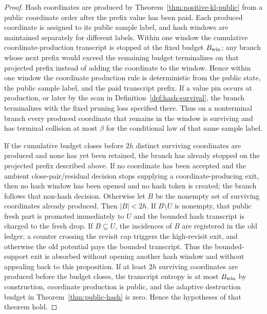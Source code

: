 \documentclass[11pt]{article}
\begin{document}
\begin{proof}
Hash coordinates are produced by Theorem~\ref{thm:positive-kl-public} from a
public coordinate order after the prefix value has been paid.  Each produced
coordinate is assigned to its public sample label, and hash windows are
maintained separately for different labels.  Within one window the cumulative
coordinate-production transcript is stopped at the fixed budget $B_{\rm win}$;
any branch whose next prefix would exceed the remaining budget terminalizes on
that projected prefix instead of adding the coordinate to the window.  Hence
within one window the coordinate production rule is deterministic from the
public state, the public sample label, and the paid transcript prefix.  If a
value pin occurs at production, or later by the scan in
Definition~\ref{def:hash-survival}, the branch terminalizes with the fixed
pruning loss specified there.  Thus on a
nonterminal branch every produced coordinate that remains in the window is
surviving and has terminal collision at most $\beta$ for the conditional law
of that same sample label.

If the cumulative budget closes before $2h$ distinct surviving coordinates
are produced and none has yet been retained, the branch has already stopped on
the projected prefix described above.  If no coordinate has been accepted and
the ambient close-pair/residual decision stops supplying a coordinate-producing
exit, then no hash window has been opened and no hash token is created; the
branch follows that non-hash decision.  Otherwise let $B$ be the nonempty set of
surviving coordinates already produced.  Then $|B|<2h$.  If $B\setminus U$ is
nonempty, that public fresh part is promoted immediately to $U$ and the bounded
hash transcript is charged to the fresh drop.  If $B\subseteq U$, the
incidences of $B$ are registered in the old ledger; a counter crossing the
revisit cap triggers the high-revisit exit, and otherwise the old potential
pays the bounded transcript.  Thus the bounded-support exit is absorbed
without opening another hash window and without appealing back to this
proposition.  If at least $2h$ surviving coordinates are produced before the
budget
closes, the transcript entropy is at most $B_{\rm win}$ by construction,
coordinate production is public, and the adaptive destruction budget in
Theorem~\ref{thm:public-hash} is zero.  Hence the hypotheses of that theorem
hold.


\end{proof}
\end{document}

